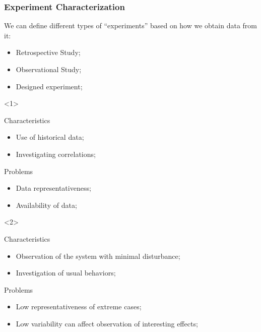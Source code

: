 \documentclass{beamer}
\begin{document}
\begin{frame}
  \frametitle{Experiment Characterization} 

  We can define different types of ``experiments'' based on how we
  obtain data from it:

  \begin{exampleblock}{}
    \begin{itemize}
    \item \alert<1>{Retrospective Study;}
    \item \alert<2>{Observational Study;}
    \item \alert<3>{Designed experiment;}
    \end{itemize}
  \end{exampleblock}

  \begin{onlyenv}<1>
  \begin{block}{Characteristics}
    \begin{itemize}
    \item Use of historical data;
    \item Investigating correlations;
    \end{itemize}
  \end{block}
  \begin{block}{Problems}
    \begin{itemize}
    \item Data representativeness;
    \item Availability of data;
    \end{itemize}
  \end{block}
  \end{onlyenv}

\begin{onlyenv}<2>
  \begin{block}{Characteristics}
    \begin{itemize}
    \item Observation of the system with minimal disturbance;
    \item Investigation of usual behaviors;
    \end{itemize}
  \end{block}
  \begin{block}{Problems}
    \begin{itemize}
    \item Low representativeness of extreme cases;
    \item Low variability can affect observation of interesting effects;
    \end{itemize}
  \end{block}
  \end{onlyenv}


\end{frame}
\end{document}
